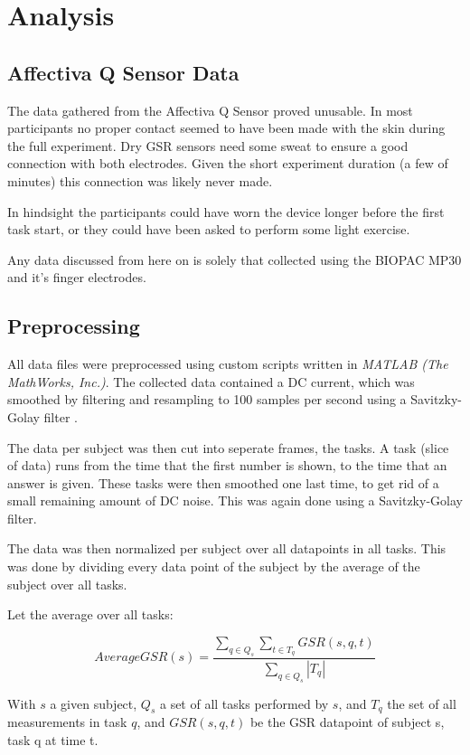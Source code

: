 \documentclass[11pt,leqno,a4paper]{report} %
\begin{document}
\section{Analysis}

\subsection{Affectiva Q Sensor Data}
The data gathered from the Affectiva Q Sensor proved unusable. In most participants no proper contact seemed to have been made with the skin during the full experiment. Dry GSR sensors need some sweat to ensure a good connection with both electrodes. Given the short experiment duration (a few of minutes) this connection was likely never made.

In hindsight the participants could have worn the device longer before the first task start, or they could have been asked to perform some light exercise. 

Any data discussed from here on is solely that collected using the BIOPAC MP30 and it's finger electrodes.


\subsection{Preprocessing}
All data files were preprocessed using custom scripts written in \emph{MATLAB (The MathWorks, Inc.)}. The collected data contained a DC current, which was smoothed by filtering and resampling to 100 samples per second using a Savitzky-Golay filter \citep{savitzky1964smoothing}. 

The data per subject was then cut into seperate frames, the tasks. A task (slice of data) runs from the time that the first number is shown, to the time that an answer is given. These tasks were then smoothed one last time, to get rid of a small remaining amount of DC noise. This was again done using a Savitzky-Golay filter.

The data was then normalized per subject over all datapoints in all tasks. This was done by dividing every data point of the subject by the average of the subject over all tasks. 

Let the average over all tasks:


\[
AverageGSR(s) = \frac 
{\sum_{q \in Q_s}\sum_{t \in T_q} GSR(s,q,t)}
{ \sum_{q \in Q_s} \left\vert{T_q}\right\vert }
\]

With $s$ a given subject, $Q_s$ a set of all tasks performed by $s$, and $T_q$ the set of all measurements in task $q$, and $GSR(s,q,t)$ be the GSR datapoint of subject s, task q at time t.
\end{document}
